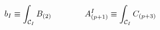 \begin{equation}
b_I \equiv \int_{{\cal C}_I} B_{(2)} \qquad\qquad A^I_{(p+1)} \equiv
\int_{{\cal C}_I} C_{(p+3)}
\end{equation}

